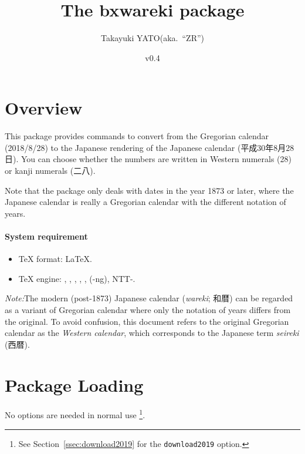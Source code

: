\documentclass[a4paper]{article}
\newcommand{\PkgVersion}{0.4}
\newcommand{\PkgDate}{2018/10/01}
\newcommand{\Pkg}[1]{\textsf{#1}}
\newcommand{\Note}{\par\noindent\emph{Note:}\quad}
\newcommand*{\Ja}[1]{{\fIpaex#1}}
\newcommand*{\+}{\hspace{0.25em minus 0.25em}}
\begin{document}
\title{The \Pkg{bxwareki} package}
\author{Takayuki YATO\quad (aka.~``ZR'')}
\date{v\PkgVersion \quad[\PkgDate]}
\maketitle

\section{Overview}
\label{sec:Overview}

This package provides commands to convert from the Gregorian calendar
(2018/8/28) to the Japanese rendering of the Japanese calendar
(\Ja{平成\+30\+年\+8\+月\+28\+日}).
You can choose whether the numbers are written
in Western numerals (28) or kanji numerals (\Ja{二八}).

Note that the package only deals with dates in the year 1873 or later,
where the Japanese calendar is really a Gregorian calendar
with the different notation of years.

\paragraph{System requirement}

\begin{itemize}
\item \TeX{} format: \LaTeX.
\item \TeX{} engine: {\pdfTeX}, {\LuaTeX}, {\XeTeX},
  {\pTeX}, {\upTeX}, {\ApTeX} ({\pTeX}-ng), NTT-{\JTeX}.
\end{itemize}

\Note The modern (post-1873) Japanese calendar (\emph{wareki}; \Ja{和暦})
can be regarded as a variant of Gregorian calendar
where only the notation of years differs from the original.
To avoid confusion, this document refers to the original Gregorian
calendar as the \emph{Western calendar},
which corresponds to the Japanese term \emph{seireki} (\Ja{西暦}).

\section{Package Loading}
\label{sec:Loading}

No options are needed in normal use%
\footnote{See Section~\ref{ssec:download2019}
  for the \texttt{download2019} option.}.
\end{document}

